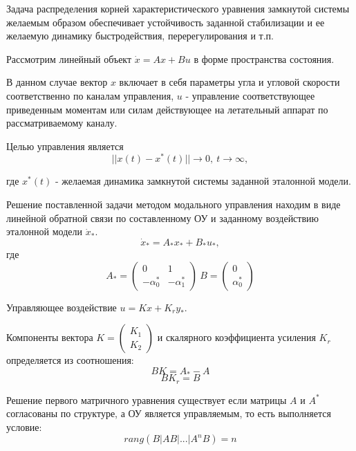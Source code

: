 Задача распределения корней характеристического уравнения замкнутой системы желаемым образом обеспечивает устойчивость заданной стабилизации и ее желаемую динамику быстродействия, перерегулирования и
т.п.

Рассмотрим линейный объект $\Dot{x} = Ax + Bu$ в форме пространства состояния.

В данном случае вектор $x$ включает в себя параметры угла и угловой скорости соответственно по каналам управления, $u$ - управление соответствующее приведенным моментам или силам действующее на летательный аппарат по рассматриваемому каналу.

Целью управления является 
$$||x(t) -  x^{*}(t)|| \rightarrow 0, \  t \rightarrow \infty, $$

где $x^{*}(t)$ - желаемая динамика замкнутой системы заданной эталонной модели.

Решение поставленной задачи методом модального управления находим в виде линейной обратной связи по составленному ОУ и заданному воздействию эталонной модели $\Dot{x}_{*}$.
\begin{equation}
\Dot{x}_{*} = A_{*} x_{*} + B_{*} u_{*},
\label{eq:ur_mod_contol_with_star}
\end{equation}
где 
$$A_{*} = \begin{pmatrix}
0 & 1 \\
- \alpha^{*}_0 & - \alpha^{*}_1 \end{pmatrix} \ B = \begin{pmatrix}0 \\ \alpha^{*}_0 \end{pmatrix}$$

Управляющее воздействие $u = K x + K_r y_{*}$.

Компоненты вектора $K = \begin{pmatrix} K_1 \\ K_2 \end{pmatrix}$ и скалярного коэффициента усиления $K_r$ определяется из соотношения:
\begin{equation}
BK = A_{*} - A
\label{eq:ur_mod_control_BK}
\end{equation}
\begin{equation}
BK_r = B
\label{eq:ur_mod_control_BKr}
\end{equation}

Решение первого матричного уравнения существует если матрицы $A$ и $A^{*}$ согласованы по структуре, а ОУ является управляемым, то есть выполняется условие:
\begin{equation}
\label{eq:usl_upr}
rang \left( B | AB|...|A^n B\right) = n
\end{equation}

